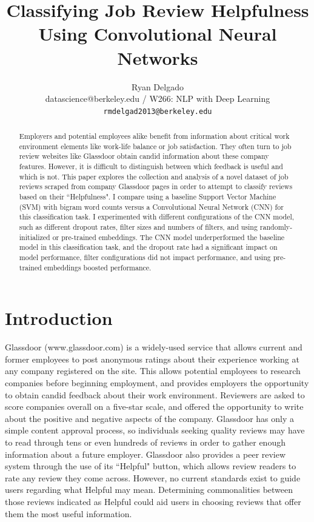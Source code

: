 \documentclass[11pt,a4paper]{article}
\title{Classifying Job Review Helpfulness Using Convolutional Neural Networks}
\author{Ryan Delgado \\
	datascience@berkeley.edu / W266: NLP with Deep Learning \\
	{\tt rmdelgad2013@berkeley.edu}
}
\date{}
\begin{document}
	\maketitle
	\begin{abstract}
		Employers and potential employees alike benefit from information about critical work environment elements like work-life balance or job satisfaction. They often turn to job review websites like Glassdoor obtain candid information about these company features. However, it is difficult to distinguish between which feedback is useful and which is not. This paper explores the collection and analysis of a novel dataset of job reviews scraped from company Glassdoor pages in order to attempt to classify reviews based on their ``Helpfulness". I compare using a baseline Support Vector Machine (SVM) with bigram word counts versus a Convolutional Neural Network (CNN) for this classification task. I experimented with different configurations of the CNN model, such as different dropout rates, filter sizes and numbers of filters, and using randomly-initialized or pre-trained embeddings. The CNN model underperformed the baseline model in this classification task, and the dropout rate had a significant impact on model performance, filter configurations did not impact performance, and using pre-trained embeddings boosted performance.
	\end{abstract}	
	
	\section{Introduction}
	Glassdoor (www.glassdoor.com) is a widely-used service that allows current and former employees to post anonymous ratings about their experience working at any company registered on the site. This allows potential employees to research companies before beginning employment, and provides employers the opportunity to obtain candid feedback about their work environment. Reviewers are asked to score companies overall on a five-star scale, and offered the opportunity to write about the positive and negative aspects of the company. Glassdoor has only a simple content approval process, so individuals seeking quality reviews may have to read through tens or even hundreds of reviews in order to gather enough information about a future employer. Glassdoor also provides a peer review system through the use of its ``Helpful" button, which allows review readers to rate any review they come across. However, no current standards exist to guide users regarding what Helpful may mean. Determining commonalities between those reviews indicated as Helpful could aid users in choosing reviews that offer them the most useful information. 
	
\end{document}
